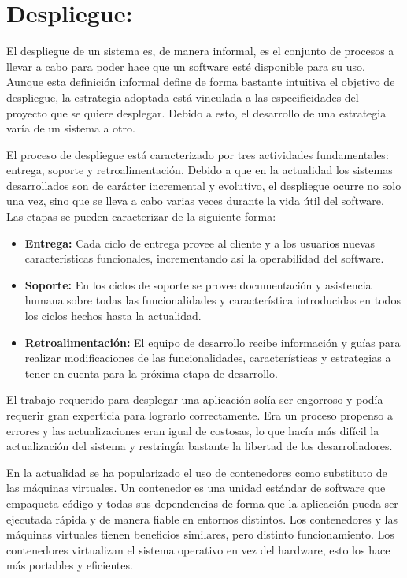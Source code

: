 \section{Despliegue:}

El despliegue de un sistema es, de manera informal, es el conjunto de procesos a llevar a cabo para poder hace que un software esté disponible para su uso. Aunque esta definición informal define de forma bastante intuitiva el objetivo de despliegue, la estrategia adoptada está vinculada a las especificidades del proyecto que se quiere desplegar. Debido a esto, el desarrollo de una estrategia varía de un sistema a otro.
\newline


El proceso de despliegue está caracterizado por tres actividades fundamentales: entrega, soporte y retroalimentación. Debido a que en la actualidad los sistemas desarrollados son de carácter incremental y evolutivo, el despliegue ocurre no solo una vez, sino que se lleva a cabo varias veces durante la vida útil del software. Las etapas se pueden caracterizar de la siguiente forma:

\begin{itemize}
	\item \textbf{Entrega:} Cada ciclo de entrega provee al cliente y a los usuarios nuevas características funcionales, incrementando así la operabilidad del software.
    \item \textbf{Soporte:} En los ciclos de soporte se provee documentación y asistencia humana sobre todas las funcionalidades y característica introducidas en todos los ciclos hechos hasta la actualidad.
    \item \textbf{Retroalimentación:} El equipo de desarrollo recibe información y guías para realizar modificaciones de las funcionalidades, características y estrategias a tener en cuenta para la próxima etapa de desarrollo.
    
\end{itemize}

El trabajo requerido para desplegar una aplicación solía ser engorroso y podía requerir gran experticia para lograrlo correctamente. Era un proceso propenso a errores y las actualizaciones eran igual de costosas, lo que hacía más difícil la actualización del sistema y restringía bastante la libertad de los desarrolladores. 
\newline

En la actualidad se ha popularizado el uso de contenedores como substituto de las máquinas virtuales.
 Un contenedor es una unidad estándar de software que empaqueta código y todas sus dependencias de forma que la aplicación pueda ser ejecutada rápida y de manera fiable en entornos distintos. Los contenedores y las máquinas virtuales tienen beneficios similares, pero distinto funcionamiento. Los contenedores virtualizan el sistema operativo en vez del hardware, esto los hace más portables y eficientes.
\newline


